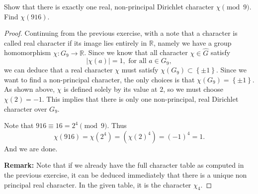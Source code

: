 \documentclass[11pt,letterpaper]{article}
\DeclareMathOperator{\1}{\mathbbm{1}}
\begin{document}
\begin{exercise}
  Show that there is exactly one real, non-principal Dirichlet character $\chi \pmod 9$. Find $\chi(916)$.
\end{exercise}
\begin{proof}
  Continuing from the previous exercise, with a note that a character is called real character if its image lies entirely in
  $\mathbb{R}$, namely  we have a group homomorphism $\chi\colon G_9 \to \mathbb{R}$. Since we know that all character $\chi \in \hat{G}$ satisfy
  \[|\chi(a)| =1, \text{ for all } a \in G_9,\]
  we can deduce that a real character $\chi$ must satisfy $\chi(G_9) \subset \left\lbrace \pm 1 \right\rbrace$. Since
  we want to find a non-principal character, the only choices is that $\chi(G_9) = \left\lbrace \pm 1\right\rbrace$. As shown
  above, $\chi$ is defined solely by its value at $2$, so we must choose $\chi(2) =-1$. This implies that there is only
  one non-principal, real Dirichlet character over $G_9$.

  Note that $916 \equiv 16 = 2^4 \pmod 9$. Thus
  \[ \chi(916) = \chi (2^4) = (\chi(2)^4) = (-1)^4=1.\]
  And we are done.

  \textbf{Remark:} Note that if we already have the full character table as computed in the previous exercise, it can be deduced immediately that
  there is a unique non principal real character. In the given table, it is the character $\chi_4$.
\end{proof}
\end{document}

